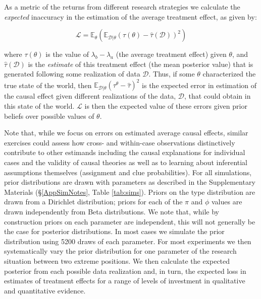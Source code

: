 \documentclass[
  12pt,
]{book}
\begin{document}
As a metric of the returns from different research strategies we calculate the \emph{expected} inaccuracy in the estimation of the average treatment effect, as given by:

\[\mathcal{L}=\mathbb{E}_\theta(\mathbb{E}_{\mathcal{D}|\theta}(\tau(\theta)-\hat{\tau}(\mathcal{D}))^2) \]

where \(\tau(\theta)\) is the value of \(\lambda_b-\lambda_a\) (the average treatment effect) given \(\theta\), and \(\hat{\tau}(\mathcal{D})\) is the \emph{estimate} of this treatment effect (the mean posterior value) that is generated following some realization of data \(\mathcal{D}\). Thus, if some \(\theta\) characterized the true state of the world, then \(\mathbb{E}_{\mathcal{D}|\theta}(\tau^\theta-\hat{\tau})^2\) is the expected error in estimation of the causal effect given different realizations of the data, \(\mathcal{D}\), that could obtain in this state of the world. \(\mathcal{L}\) is then the expected value of these errors given prior beliefs over possible values of \(\theta\).

Note that, while we focus on errors on estimated average causal effects, similar exercises could assess how cross- and within-case observations distinctively contribute to other estimands \textbar{} including the causal explanations for individual cases and the validity of causal theories \textbar{} as well as to learning about inferential assumptions themselves (assignment and clue probabilities).
For all simulations, prior distributions are drawn with parameters as described in the Supplementary Materials (\S \ref{AppSimNotes}, Table \ref{tab:sims}). Priors on the type distribution are drawn from a Dirichlet distribution; priors for each of the \(\pi\) and \(\phi\) values are drawn independently from Beta distributions. We note that, while by construction priors on each parameter are independent, this will not generally be the case for posterior distributions. In most cases we simulate the prior distribution using 5200 draws of each parameter. For most experiments we then systematically vary the prior distribution for one parameter of the research situation between two extreme positions. We then calculate the expected posterior from each possible data realization and, in turn, the expected loss in estimates of treatment effects for a range of levels of investment in qualitative and quantitative evidence.
\end{document}
